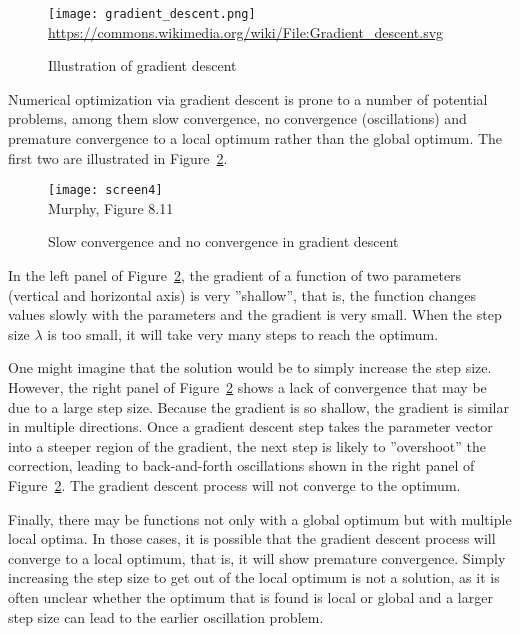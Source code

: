 \begin{figure}
\centering
\texttt{[image: gradient\_descent.png]} \\

\scriptsize \url{https://commons.wikimedia.org/wiki/File:Gradient_descent.svg}
\caption{Illustration of gradient descent}
\label{fig:gradientdescent}
\end{figure}

Numerical optimization via gradient descent is prone to a number of potential problems, among them slow convergence, no convergence (oscillations) and premature convergence to a local optimum rather than the global optimum. The first two are illustrated in Figure~\ref{fig:screen4_chap15}.

\begin{figure}
\centering
\texttt{[image: screen4]} \\

\scriptsize Murphy, Figure 8.11
\caption{Slow convergence and no convergence in gradient descent}
\label{fig:screen4_chap15}
\end{figure}

In the left panel of Figure~\ref{fig:screen4_chap15}, the gradient of a function of two parameters (vertical and horizontal axis) is very ''shallow'', that is, the function changes values slowly with the parameters and the gradient is very small. When the step size $\lambda$ is too small, it will take very many steps to reach the optimum. 

One might imagine that the solution would be to simply increase the step size. However, the right panel of Figure~\ref{fig:screen4_chap15} shows a lack of convergence that may be due to a large step size. Because the gradient is so shallow, the gradient is similar in multiple directions. Once a gradient descent step takes the parameter vector into a steeper region of the gradient, the next step is likely to ''overshoot'' the correction, leading to back-and-forth oscillations shown in the right panel of Figure~\ref{fig:screen4_chap15}. The gradient descent process will not converge to the optimum. 

Finally, there may be functions not only with a global optimum but with multiple local optima. In those cases, it is possible that the gradient descent process will converge to a local optimum, that is, it will show premature convergence. Simply increasing the step size to get out of the local optimum is not a solution, as it is often unclear whether the optimum that is found is local or global and a larger step size can lead to the earlier oscillation problem.

